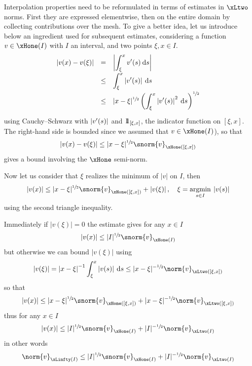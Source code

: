 \medskip
Interpolation properties need to be reformulated in terms of estimates in $\xLtwo$ norms.
First they are expressed elementwise, then on the entire domain by collecting contributions over the mesh.
To give a better idea, let us introduce below an ingredient used for subsequent estimates, considering a function $v\in\xHone(I)$ with $I$ an interval, and two points $\xi, x \in I$.
\begin{equation*}
\begin{array}{lcl}
\left\lvert v(x) - v(\xi) \right\rvert &=&    \displaystyle\left\lvert \int_\xi^x v'(s) \hspace{.5ex}{\mathrm d} s \right\rvert\\[2ex]
                    &\leq& \displaystyle\int_\xi^x \left\lvert v'(s) \right\rvert \hspace{.5ex}{\mathrm d} s\\[2ex]
                    &\leq& \displaystyle|x - \xi|^{\sfrac{1}{2}}\left(\int_\xi^x \left\lvert v'(s) \right\rvert^{2} \hspace{.5ex}{\mathrm d} s\right)^{\sfrac{1}{2}}\\[2ex]
\end{array}
\end{equation*}
using Cauchy--Schwarz with $\left\lvert v'(s) \right\rvert$ and $\displaystyle{1\!\!1_{[\xi, x]}}$, the indicator function on $[\xi, x]$.
The right-hand side is bounded since we assumed that $v\in\xHone(I)$), so that
\begin{equation}\label{eq:interpolation_estimate_1}
\Abs{v(x) - v(\xi)} \leq \displaystyle|x - \xi|^{\sfrac{1}{2}}\snorm{v}_{\xHone([\xi, x])}
\end{equation}
gives a bound involving the $\xHone$ semi-norm.

\medskip
Now let us consider that $\xi$ realizes the minimum of $|v|$ on $I$, then
\begin{equation*}
\Abs{v(x)} \leq |x - \xi|^{\sfrac{1}{2}}\snorm{v}_{\xHone([\xi, x])} + \Abs{v(\xi)},\quad \xi = \argmin{s\in I} |v(s)|
\end{equation*}
using the second triangle inequality.

\medskip
Immediately if $|v(\xi)| = 0$ the estimate gives for any $x\in I$
\begin{equation}\label{eq:interpolation_estimate_2}
\Abs{v(x)} \leq |I|^{\sfrac{1}{2}}\snorm{v}_{\xHone(I)}
\end{equation}
but otherwise we can bound $|v(\xi)|$ using
\begin{equation*}
\Abs{v(\xi)} = \Abs{x-\xi}^{-1} \int_\xi^x \Abs{v(s)} \md s \leq |x - \xi|^{-\sfrac{1}{2}}\norm{v}_{\xLtwo([\xi, x])}
\end{equation*}
so that
\begin{equation*}
\Abs{v(x)} \leq |x - \xi|^{\sfrac{1}{2}}\snorm{v}_{\xHone([\xi, x])} + |x - \xi|^{-\sfrac{1}{2}}\norm{v}_{\xLtwo([\xi, x])}
\end{equation*}
thus for any $x\in I$
\begin{equation}\label{eq:interpolation_estimate_2}
\Abs{v(x)} \leq |I|^{\sfrac{1}{2}}\snorm{v}_{\xHone(I)} + |I|^{-\sfrac{1}{2}}\norm{v}_{\xLtwo(I)}
\end{equation}
in other words
\begin{equation}\label{eq:interpolation_estimate_3}
\norm{v}_{\xLinfty(I)} \leq |I|^{\sfrac{1}{2}}\snorm{v}_{\xHone(I)} + |I|^{-\sfrac{1}{2}}\norm{v}_{\xLtwo(I)}
\end{equation}


